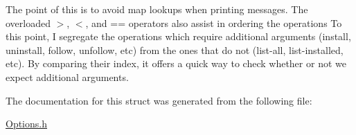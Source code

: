 The point of this is to avoid map lookups when printing messages. The overloaded $>$, $<$, and == operators also assist in ordering the operations To this point, I segregate the operations which require additional arguments (install, uninstall, follow, unfollow, etc) from the ones that do not (list-\/all, list-\/installed, etc). By comparing their index, it offers a quick way to check whether or not we expect additional arguments. 

The documentation for this struct was generated from the following file\+:\begin{DoxyCompactItemize}
\item 
\mbox{\hyperlink{Options_8h}{Options.\+h}}\end{DoxyCompactItemize}
